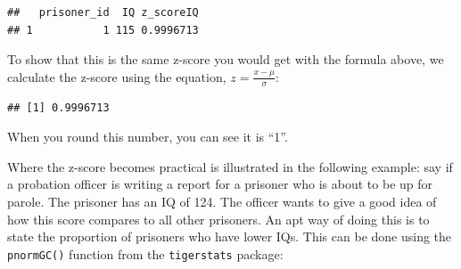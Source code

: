 \documentclass[
]{book}
\newenvironment{Shaded}{\begin{snugshade}}{\end{snugshade}}
\newcommand{\CommentTok}[1]{\textcolor[rgb]{0.56,0.35,0.01}{\textit{#1}}}
\newcommand{\DecValTok}[1]{\textcolor[rgb]{0.00,0.00,0.81}{#1}}
\newcommand{\FunctionTok}[1]{\textcolor[rgb]{0.00,0.00,0.00}{#1}}
\newcommand{\NormalTok}[1]{#1}
\newcommand{\OtherTok}[1]{\textcolor[rgb]{0.56,0.35,0.01}{#1}}
\newcommand{\SpecialCharTok}[1]{\textcolor[rgb]{0.00,0.00,0.00}{#1}}
\begin{document}
\begin{Shaded}
\end{Shaded}

\begin{verbatim}
##   prisoner_id  IQ z_scoreIQ
## 1           1 115 0.9996713
\end{verbatim}

To show that this is the same z-score you would get with the formula above, we calculate the z-score using the equation, \(z = \frac{x - \mu}{\sigma}\):

\begin{Shaded}
\end{Shaded}

\begin{verbatim}
## [1] 0.9996713
\end{verbatim}

When you round this number, you can see it is ``1''.

Where the z-score becomes practical is illustrated in the following example: say if a probation officer is writing a report for a prisoner who is about to be up for parole. The prisoner has an IQ of 124. The officer wants to give a good idea of how this score compares to all other prisoners. An apt way of doing this is to state the proportion of prisoners who have lower IQs. This can be done using the \texttt{pnormGC()} function from the \texttt{tigerstats} package:
\end{document}
